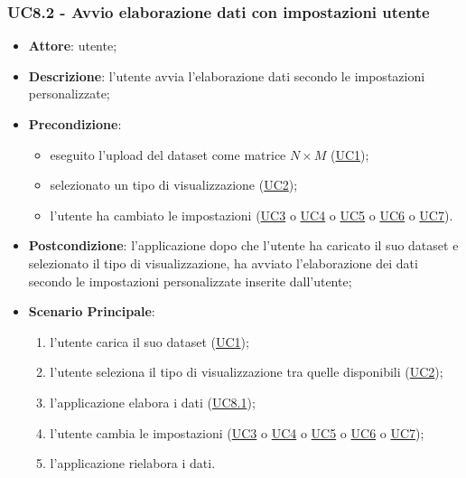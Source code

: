     \subsubsection{UC8.2 - Avvio elaborazione dati con impostazioni utente}
    \label{uc8.2}
    \begin{itemize}
    \item \textbf{Attore}: utente;
    \item \textbf{Descrizione}:  l'utente avvia l'elaborazione dati secondo le impostazioni personalizzate;
    \item \textbf{Precondizione}: 
    \begin{itemize}
        \item eseguito l'upload del dataset come matrice $N\times M$ (\hyperref[uc1]{UC1});
        \item selezionato un tipo di visualizzazione (\hyperref[uc2]{UC2});
        \item l'utente ha cambiato le impostazioni (\hyperref[uc3]{UC3} o \hyperref[uc4]{UC4} o \hyperref[uc5]{UC5} o \hyperref[uc6]{UC6} o \hyperref[uc7]{UC7}).
    \end{itemize}  
    \item \textbf{Postcondizione}: l'applicazione dopo che l'utente ha caricato il suo dataset e selezionato il tipo di visualizzazione, ha avviato l'elaborazione dei dati secondo le impostazioni personalizzate inserite dall'utente;
    \item \textbf{Scenario Principale}: 
    \begin{enumerate}
        \item l'utente carica il suo dataset (\hyperref[uc1]{UC1});
        \item l'utente seleziona il tipo di visualizzazione tra quelle disponibili (\hyperref[uc2]{UC2});
        \item l'applicazione elabora i dati (\hyperref[uc8.1]{UC8.1});
        \item l'utente cambia le impostazioni (\hyperref[uc3]{UC3} o \hyperref[uc4]{UC4} o \hyperref[uc5]{UC5} o \hyperref[uc6]{UC6} o \hyperref[uc7]{UC7});
        \item l'applicazione rielabora i dati.
    \end{enumerate}
    \end{itemize}